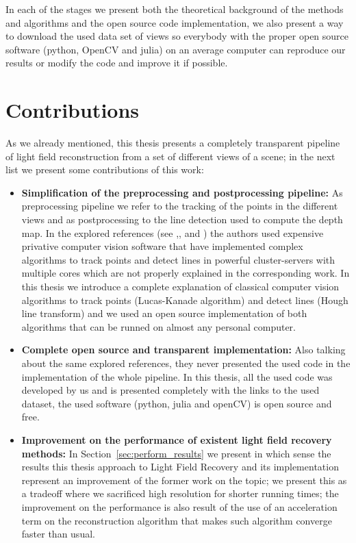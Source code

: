 In each of the stages we present both the theoretical background of the methods and algorithms and the open source code implementation, we also present a way to download the used data set of views so everybody with the proper open source software (python, OpenCV and julia) on an average computer can reproduce our results or modify the code and improve it if possible.

\section{Contributions}

As we already mentioned, this thesis presents a completely transparent pipeline of light field reconstruction from a set of different views of a scene; in the next list we present some contributions of this work:
 
\begin{itemize}
\item \textbf{Simplification of the preprocessing and postprocessing pipeline:} As preprocessing pipeline we refer to the tracking of the points in the different views and as postprocessing to the line detection used to compute the depth map. In the explored references (see \cite{Bolles},\cite{LF-Shearlets}, \cite{Kim-Disney} and \cite{CompressedMIT}) the authors used expensive privative computer vision software that have implemented complex algorithms to track points and detect lines in powerful cluster-servers with multiple cores which are not properly explained in the corresponding work. In this thesis we introduce a complete explanation of classical computer vision algorithms to track points (Lucas-Kanade algorithm) and detect lines (Hough line transform) and we used an open source implementation of both algorithms that can be runned on almost any personal computer.

\item \textbf{Complete open source and transparent implementation:} Also talking about the same explored references, they never presented the used code in the implementation of the whole pipeline. In this thesis, all the used code was developed by us and is presented completely with the links to the used dataset, the used software (python, julia and openCV) is open source and free.

\item \textbf{Improvement on the performance of existent light field recovery methods:} In Section~\ref{sec:perform_results} we present in which sense the results this thesis approach to Light Field Recovery and its implementation represent an improvement of the former work on the topic; we present this as a tradeoff where we sacrificed high resolution for shorter running times; the improvement on the performance is also result of the use of an acceleration term on the reconstruction algorithm that makes such algorithm converge faster than usual. 

\end{itemize}

